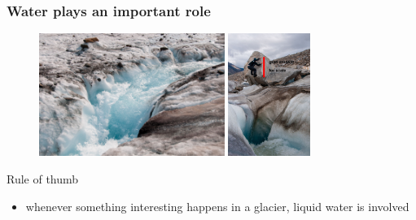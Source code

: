 \documentclass[hide notes,intlimits,unknownkeysallowed]{beamer}
\begin{document}
\begin{frame}
  \frametitle{Water plays an important role}
  \begin{figure}
    \includegraphics[height=4cm]{black-rapids-1} \vspace{0.25em}
    \includegraphics[height=4cm]{black-rapids-2}
  \end{figure}
  \begin{block}{Rule of thumb}
    \begin{itemize}
    \item whenever something interesting happens in a glacier, liquid water is involved
    \end{itemize}
  \end{block}
\end{frame}

  {
} 
\end{document}

